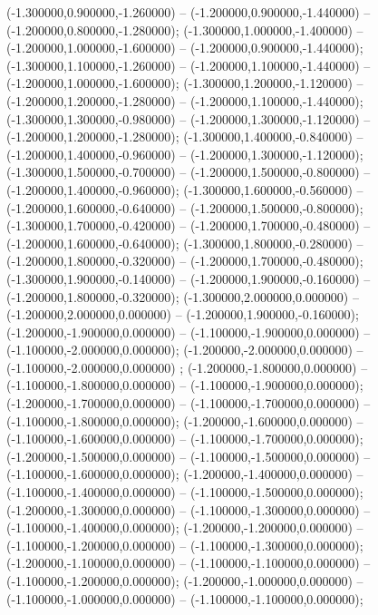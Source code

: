  (-1.300000,0.900000,-1.260000) -- (-1.200000,0.900000,-1.440000) -- (-1.200000,0.800000,-1.280000);
 (-1.300000,1.000000,-1.400000) -- (-1.200000,1.000000,-1.600000) -- (-1.200000,0.900000,-1.440000);
 (-1.300000,1.100000,-1.260000) -- (-1.200000,1.100000,-1.440000) -- (-1.200000,1.000000,-1.600000);
 (-1.300000,1.200000,-1.120000) -- (-1.200000,1.200000,-1.280000) -- (-1.200000,1.100000,-1.440000);
 (-1.300000,1.300000,-0.980000) -- (-1.200000,1.300000,-1.120000) -- (-1.200000,1.200000,-1.280000);
 (-1.300000,1.400000,-0.840000) -- (-1.200000,1.400000,-0.960000) -- (-1.200000,1.300000,-1.120000);
 (-1.300000,1.500000,-0.700000) -- (-1.200000,1.500000,-0.800000) -- (-1.200000,1.400000,-0.960000);
 (-1.300000,1.600000,-0.560000) -- (-1.200000,1.600000,-0.640000) -- (-1.200000,1.500000,-0.800000);
 (-1.300000,1.700000,-0.420000) -- (-1.200000,1.700000,-0.480000) -- (-1.200000,1.600000,-0.640000);
 (-1.300000,1.800000,-0.280000) -- (-1.200000,1.800000,-0.320000) -- (-1.200000,1.700000,-0.480000);
 (-1.300000,1.900000,-0.140000) -- (-1.200000,1.900000,-0.160000) -- (-1.200000,1.800000,-0.320000);
 (-1.300000,2.000000,0.000000) -- (-1.200000,2.000000,0.000000) -- (-1.200000,1.900000,-0.160000);
 (-1.200000,-1.900000,0.000000) -- (-1.100000,-1.900000,0.000000) -- (-1.100000,-2.000000,0.000000);
 (-1.200000,-2.000000,0.000000) -- (-1.100000,-2.000000,0.000000) ;
 (-1.200000,-1.800000,0.000000) -- (-1.100000,-1.800000,0.000000) -- (-1.100000,-1.900000,0.000000);
 (-1.200000,-1.700000,0.000000) -- (-1.100000,-1.700000,0.000000) -- (-1.100000,-1.800000,0.000000);
 (-1.200000,-1.600000,0.000000) -- (-1.100000,-1.600000,0.000000) -- (-1.100000,-1.700000,0.000000);
 (-1.200000,-1.500000,0.000000) -- (-1.100000,-1.500000,0.000000) -- (-1.100000,-1.600000,0.000000);
 (-1.200000,-1.400000,0.000000) -- (-1.100000,-1.400000,0.000000) -- (-1.100000,-1.500000,0.000000);
 (-1.200000,-1.300000,0.000000) -- (-1.100000,-1.300000,0.000000) -- (-1.100000,-1.400000,0.000000);
 (-1.200000,-1.200000,0.000000) -- (-1.100000,-1.200000,0.000000) -- (-1.100000,-1.300000,0.000000);
 (-1.200000,-1.100000,0.000000) -- (-1.100000,-1.100000,0.000000) -- (-1.100000,-1.200000,0.000000);
 (-1.200000,-1.000000,0.000000) -- (-1.100000,-1.000000,0.000000) -- (-1.100000,-1.100000,0.000000);

